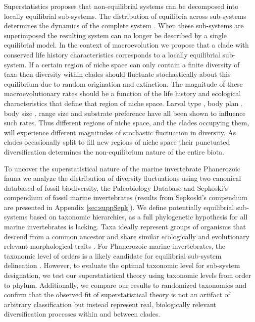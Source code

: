 \documentclass[12pt]{article}
\let\citep=\autocite
\begin{document}
Superstatistics \citep{beck2003} proposes that non-equilibrial systems
can be decomposed into locally equilibrial sub-systems. The
distribution of equilibria across sub-systems determines the dynamics
of the complete system \citep{beck2003}. When these sub-systems are
superimposed the resulting system can no longer be described by a
single equilibrial model. In the context of macroevolution we propose
that a clade with conserved life history characteristics corresponds
to a locally equilibrial sub-system. If a certain region of niche
space can only contain a finite diversity of taxa \citep{simpson1953,
  gavrilets2005, rabosky2009ecolLett, price2014} then diversity within
clades should fluctuate stochastically about this equilibrium due to
random origination and extinction. The magnitude of these
macroevolutionary rates should be a function of the life history and
ecological characteristics that define that region of niche
space. Larval type \citep{jablonski2008}, body plan \citep{erwin2012},
body size \citep{harnik2011}, range size \citep{harnik2011,
  foote2008paleobiol} and substrate preference \citep{hopkins2014}
have all been shown to influence such rates. Thus different regions of
niche space, and the clades occupying them, will experience different
magnitudes of stochastic fluctuation in diversity. As clades
occasionally split to fill new regions of niche space their punctuated
diversification determines the non-equilibrium nature of the entire
biota.

To uncover the superstatistical nature of the marine invertebrate
Phanerozoic fauna we analyze the distribution of diversity
fluctuations using two canonical databased of fossil biodiversity, the
Paleobiology Database \citep[PBDB;][]{alroy08} and Sepkoski's
compendium \citep{sepkoski1992} of fossil marine invertebrates
(results from Sepkoski's compendium are presented in Appendix
\ref{sec:suppSepk}).  We define potentially equilibrial sub-systems
based on taxonomic hierarchies, as a full phylogenetic hypothesis for
all marine invertebrates is lacking.  Taxa ideally represent groups of
organisms that descend from a common ancestor and share similar
ecologically and evolutionary relevant morphological traits
\citep{mayr1965systZool, erwin2007}.  For Phanerozoic marine
invertebrates, the taxonomic level of orders is a likely candidate for
equilibrial sub-system delineation \citep{holman1989}. However, to
evaluate the optimal taxonomic level for sub-system designation, we
test our superstatistical theory using taxonomic levels from order to
phylum. Additionally, we compare our results to randomized taxonomies
and confirm that the observed fit of superstatistical theory is not an
artifact of arbitrary classification but instead represent real,
biologically relevant diversification processes within and between
clades.
\end{document}
